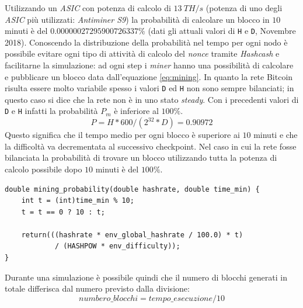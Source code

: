 Utilizzando un \textit{ASIC} con potenza di calcolo di $13~TH/s$ (potenza di uno degli \textit{ASIC} più utilizzati: \textit{Antiminer S9}) la probabilità di calcolare un blocco in $10$ minuti è del $0.00000027295900726337\%$ (dati gli attuali valori di \texttt{H} e \texttt{D}, Novembre 2018).\newline
Conoscendo la distribuzione della probabilità nel tempo per ogni nodo è possibile evitare ogni tipo di attività di calcolo del \textit{nonce} tramite \textit{Hashcash} e facilitarne la simulazione: ad ogni step i \textit{miner} hanno una possibilità di calcolare e pubblicare un blocco data dall'equazione \ref{eq:mining}.
In quanto la rete Bitcoin risulta essere molto variabile spesso i valori \texttt{D} ed \texttt{H} non sono sempre bilanciati; in questo caso si dice che la rete non è in uno stato \textit{steady}. Con i precedenti valori di \texttt{D} e \texttt{H} infatti la probabilità $P_m$ è inferiore al $100\%$.
\begin{equation}
    P = H * 600 / (2^{32} * D) = 0.90972%
\end{equation}
Questo significa che il tempo medio per ogni blocco è superiore ai $10$ minuti e che la difficoltà va decrementata al successivo checkpoint.
Nel caso in cui la rete fosse bilanciata la probabilità di trovare un blocco utilizzando tutta la potenza di calcolo possibile dopo $10$ minuti è del $100\%$.
\begin{code}
\begin{verbatim}
double mining_probability(double hashrate, double time_min) {
    int t = (int)time_min % 10;
    t = t == 0 ? 10 : t;

    return(((hashrate * env_global_hashrate / 100.0) * t)
            / (HASHPOW * env_difficulty));
}
\end{verbatim}
Durante una simulazione è possibile quindi che il numero di blocchi generati in totale differisca dal numero previsto dalla divisione:
\begin{equation}
    numbero\_blocchi = tempo\_esecuzione/10
\end{equation}
\end{code}
